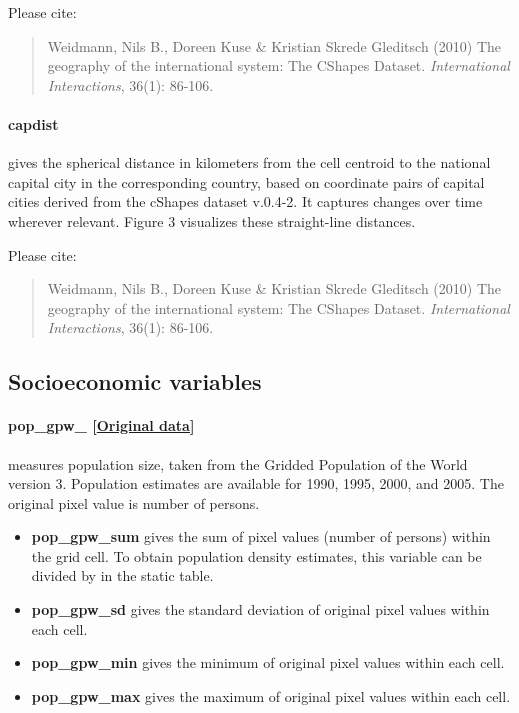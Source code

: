 \documentclass[]{book}
\begin{document}
Please cite:

\begin{quote}
Weidmann, Nils B., Doreen Kuse \& Kristian Skrede Gleditsch (2010) The
geography of the international system: The CShapes Dataset.
\emph{International Interactions}, 36(1): 86-106.
\end{quote}

\paragraph{capdist}\label{capdist}

gives the spherical distance in kilometers from the cell centroid to the
national capital city in the corresponding country, based on coordinate
pairs of capital cities derived from the cShapes dataset v.0.4-2. It
captures changes over time wherever relevant. Figure 3 visualizes these
straight-line distances.

Please cite:

\begin{quote}
Weidmann, Nils B., Doreen Kuse \& Kristian Skrede Gleditsch (2010) The
geography of the international system: The CShapes Dataset.
\emph{International Interactions}, 36(1): 86-106.
\end{quote}

\subsection{Socioeconomic variables}\label{socioeconomic-variables-1}

\paragraph{pop\_gpw\_
{[}\href{http://sedac.ciesin.columbia.edu/data/collection/gpw-v3}{Original
data}{]}}\label{pop-gpw-}

measures population size, taken from the Gridded Population of the World
version 3. Population estimates are available for 1990, 1995, 2000, and
2005. The original pixel value is number of persons.

\begin{itemize}
\itemsep1pt\parskip0pt
\item
  \textbf{pop\_gpw\_sum} gives the sum of pixel values (number of
  persons) within the grid cell. To obtain population density estimates,
  this variable can be divided by  in the static table.
\item
  \textbf{pop\_gpw\_sd} gives the standard deviation of original pixel
  values within each cell.
\item
  \textbf{pop\_gpw\_min} gives the minimum of original pixel values
  within each cell.
\item
  \textbf{pop\_gpw\_max} gives the maximum of original pixel values
  within each cell.
\end{itemize}
\end{document}
